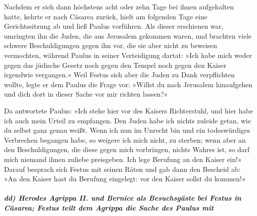  Nachdem er sich dann höchstens acht oder zehn Tage bei
ihnen aufgehalten hatte, kehrte er nach Cäsarea zurück, hielt am
folgenden Tage eine Gerichtssitzung ab und ließ Paulus vorführen.
 Als dieser erschienen war, umringten ihn die Juden, die
aus Jerusalem gekommen waren, und brachten viele schwere Beschuldigungen
gegen ihn vor, die sie aber nicht zu beweisen vermochten, 
während Paulus in seiner Verteidigung dartat: »Ich habe mich weder gegen
das jüdische Gesetz noch gegen den Tempel noch gegen den Kaiser
irgendwie vergangen.«  Weil Festus sich aber die Juden zu
Dank verpflichten wollte, legte er dem Paulus die Frage vor: »Willst du
nach Jerusalem hinaufgehen und dich dort in dieser Sache vor mir richten
lassen?«

 Da antwortete Paulus: »Ich stehe hier vor des Kaisers
Richterstuhl, und hier habe ich auch mein Urteil zu empfangen. Den Juden
habe ich nichts zuleide getan, wie du selbst ganz genau weißt.
 Wenn ich nun im Unrecht bin und ein todeswürdiges
Verbrechen begangen habe, so weigere ich mich nicht, zu sterben; wenn
aber an den Beschuldigungen, die diese gegen mich vorbringen, nichts
Wahres ist, so darf mich niemand ihnen zuliebe preisgeben. Ich lege
Berufung an den Kaiser ein!«  Darauf besprach sich Festus
mit seinen Räten und gab dann den Bescheid ab: »An den Kaiser hast du
Berufung eingelegt: vor den Kaiser sollst du kommen!«

\hypertarget{dd-herodes-agrippa-ii.-und-bernice-als-besuchsguxe4ste-bei-festus-in-cuxe4sarea-festus-teilt-dem-agrippa-die-sache-des-paulus-mit}{%
\subparagraph{dd) Herodes Agrippa II. und Bernice als Besuchsgäste bei
Festus in Cäsarea; Festus teilt dem Agrippa die Sache des Paulus
mit}\label{dd-herodes-agrippa-ii.-und-bernice-als-besuchsguxe4ste-bei-festus-in-cuxe4sarea-festus-teilt-dem-agrippa-die-sache-des-paulus-mit}}

